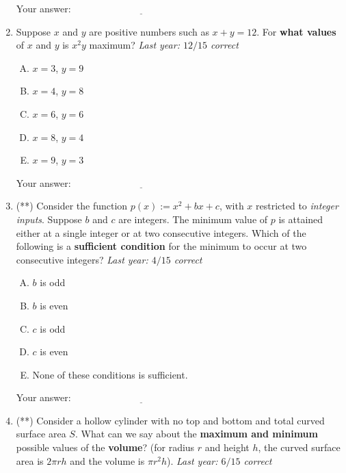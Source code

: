 \documentclass[10pt]{amsart}
\begin{document}
\begin{enumerate}
  \vspace{0.1in}
  Your answer: $\underline{\qquad\qquad\qquad\qquad\qquad\qquad\qquad}$
  \vspace{0.6in}

\item Suppose $x$ and $y$ are positive numbers such as $x + y =
  12$. For {\bf what values} of $x$ and $y$ is $x^2y$ maximum? {\em
  Last year: $12/15$ correct}

  \begin{enumerate}[(A)]
  \item $x = 3$, $y = 9$
  \item $x = 4$, $y = 8$
  \item $x = 6$, $y = 6$
  \item $x = 8$, $y = 4$
  \item $x = 9$, $y = 3$
  \end{enumerate}

  \vspace{0.1in}
  Your answer: $\underline{\qquad\qquad\qquad\qquad\qquad\qquad\qquad}$
  \vspace{0.6in}

\item (**) Consider the function $p(x) := x^2 + bx + c$, with $x$
  restricted to {\em integer inputs}. Suppose $b$ and $c$ are
  integers. The minimum value of $p$ is attained either at a single
  integer or at two consecutive integers. Which of the following is a
  {\bf sufficient condition} for the minimum to occur at two
  consecutive integers? {\em Last year: $4/15$ correct}

  \begin{enumerate}[(A)]
  \item $b$ is odd
  \item $b$ is even
  \item $c$ is odd
  \item $c$ is even
  \item None of these conditions is sufficient.
  \end{enumerate}

  \vspace{0.1in}
  Your answer: $\underline{\qquad\qquad\qquad\qquad\qquad\qquad\qquad}$
  \vspace{0.6in}

\item (**) Consider a hollow cylinder with no top and bottom and total
  curved surface area $S$. What can we say about the {\bf maximum and
  minimum} possible values of the {\bf volume}? (for radius $r$ and height
  $h$, the curved surface area is $2\pi rh$ and the volume is $\pi
  r^2h$). {\em Last year: $6/15$ correct}


\end{enumerate}
\end{document}
